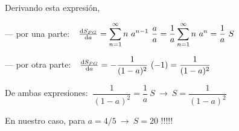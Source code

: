 \begin{myexampleblock}
\vspace{2mm} Derivando esta expresión, 

\vspace{2mm} --- por una parte: $\ \ \dv{S_{PG}}{a}=\displaystyle \sum_{n=1}^\infty n\ a^{n-1} \ \dfrac a a = \dfrac 1 a \sum_{n=1}^\infty n\ a^n = \dfrac 1 a \ S$

\vspace{2mm} --- por otra parte: $\ \ \dv{S_{PG}}{a}=-\dfrac 1 {(1-a)^2} \ (-1)=\dfrac 1 {(1-a)^2}$

\vspace{2mm} De ambas expresiones: $\ \dfrac 1 {(1-a)^2}=\dfrac 1 a \ S \ \to \ S=\dfrac{1}{(1-a)^2}$

\vspace{2mm} En nuestro caso, para $a=4/5 \ \to \ S=20$ !!!!!
	
\end{myexampleblock}


%

\newpage


$\quad$

$\quad$

$\quad$

